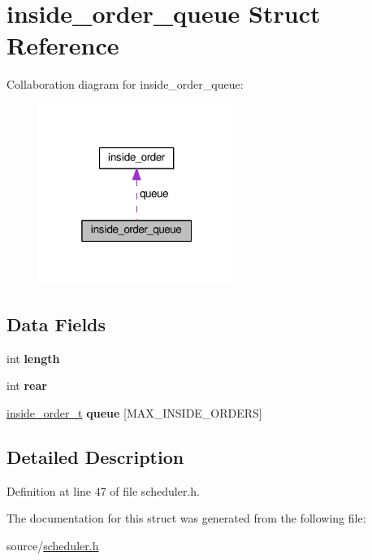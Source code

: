 \hypertarget{structinside__order__queue}{}\section{inside\+\_\+order\+\_\+queue Struct Reference}
\label{structinside__order__queue}


Collaboration diagram for inside\+\_\+order\+\_\+queue\+:\nopagebreak
\begin{figure}[H]
\begin{center}
\leavevmode
\includegraphics[width=181pt]{structinside__order__queue__coll__graph}
\end{center}
\end{figure}
\subsection*{Data Fields}
\begin{DoxyCompactItemize}
\item 
int {\bfseries length}\hypertarget{structinside__order__queue_af25818967b7fcb1153ca2f3b0680526f}{}\label{structinside__order__queue_af25818967b7fcb1153ca2f3b0680526f}

\item 
int {\bfseries rear}\hypertarget{structinside__order__queue_ab8e16f2ab4d7e5563e98981b4f5f0d54}{}\label{structinside__order__queue_ab8e16f2ab4d7e5563e98981b4f5f0d54}

\item 
\hyperlink{structinside__order}{inside\+\_\+order\+\_\+t} {\bfseries queue} \mbox{[}M\+A\+X\+\_\+\+I\+N\+S\+I\+D\+E\+\_\+\+O\+R\+D\+E\+RS\mbox{]}\hypertarget{structinside__order__queue_a4dd512cf1ce8c0f4d5ff0b8cacbfc6cd}{}\label{structinside__order__queue_a4dd512cf1ce8c0f4d5ff0b8cacbfc6cd}

\end{DoxyCompactItemize}


\subsection{Detailed Description}


Definition at line 47 of file scheduler.\+h.



The documentation for this struct was generated from the following file\+:\begin{DoxyCompactItemize}
\item 
source/\hyperlink{scheduler_8h}{scheduler.\+h}\end{DoxyCompactItemize}
